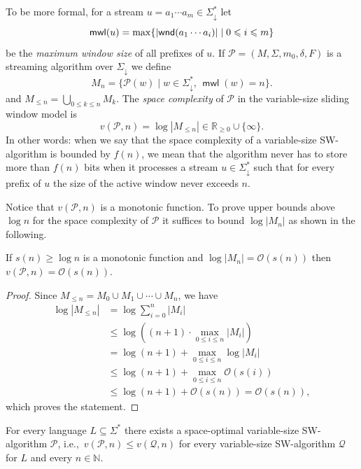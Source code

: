 \documentclass{article}\usepackage[a4paper,margin=20mm]{geometry}
\newcommand{\N}{\mathbb{N}}
\renewcommand{\O}{\mathcal{O}}
\renewcommand{\P}{\mathcal{P}}
\newcommand{\Q}{\mathcal{Q}}
\DeclareMathOperator{\wnd}{\mathsf{wnd}}
\DeclareMathOperator{\mwl}{\mathsf{mwl}}
\DeclarePairedDelimiter{\abs}{\lvert}{\rvert}
\renewcommand{\geq}{\geqslant}
\renewcommand{\leq}{\leqslant}
\renewcommand{\ge}{\geq}
\renewcommand{\le}{\leq}
\begin{document}
To be more formal, for a stream $u = a_1 \cdots a_m \in \Sigma_\downarrow^*$ 
let 
\[\mwl(u) = \max \{ \abs{\wnd(a_1 \cdots a_i)} \mid 0 \le i \le m\}\]
be the {\em maximum window size} of all prefixes of $u$.
If $\P = (M,\Sigma,m_0,\delta,F)$ is a streaming algorithm over $\Sigma_\downarrow$
we define
\begin{equation} \label{defM_n}
	M_n = \{ \P(w) \mid w \in \Sigma_\downarrow^*, \, \mwl(w) = n \}.
\end{equation}
and $M_{\le n} = \bigcup_{0 \le k \le n} M_k$.
The {\em space complexity} of $\P$ in the variable-size sliding window model is 
\[
	v(\P,n) = \log |M_{\le n}| \in \mathbb{R}_{\ge 0} \cup \{\infty\}.
\]
In other words: when we say that the space complexity of a variable-size SW-algorithm
is bounded by $f(n)$, we mean that the algorithm never has to store more than $f(n)$ bits
when it processes a stream $u \in \Sigma_\downarrow^*$ such that for every prefix of $u$
the size of the active window never exceeds $n$. 

Notice that $v(\P,n)$ is a monotonic function.
To prove upper bounds above $\log n$ for the space complexity of $\P$
it suffices to bound $\log |M_n|$ as shown in the following.

\begin{lemma}
	If $s(n) \ge \log n$ is a monotonic function
	and $\log |M_n| = \O(s(n))$ then $v(\P,n) = \O(s(n))$.
\end{lemma}
\begin{proof}
Since $M_{\le n} = M_{0} \cup M_{1} \cup \cdots \cup M_{n}$, we have
\begin{align*}
	\log |M_{\le n}| &= \log \sum_{i=0}^n |M_{i}| \\
	& \le \log \left( (n+1) \cdot \max_{0 \le i \le n} |M_{i}| \right) \\
	& = \log(n+1) + \max_{0 \le i \le n} \log |M_{i}| \\
	& \le \log(n+1) + \max_{0 \le i \le n} \O(s(i)) \\
	& \le \log(n+1) + \O(s(n)) = \O(s(n)),
\end{align*}
which proves the statement.
\end{proof}

\begin{lemma}
	\label{lem:optimal-vs}
	For every language $L \subseteq \Sigma^*$
	there exists a space-optimal variable-size SW-algorithm $\P$,
	i.e.,~$v(\P,n) \leq v(\Q,n)$ for every variable-size SW-algorithm $\Q$ for $L$ and every $n \in \N$.
\end{lemma}
\end{document}

